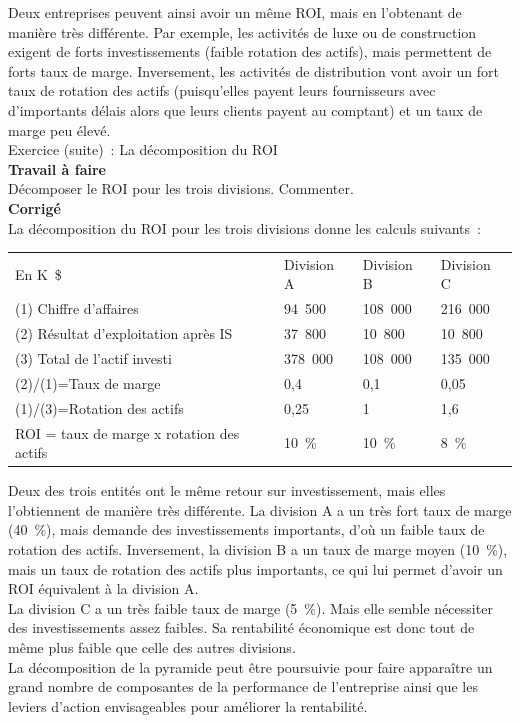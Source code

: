 \documentclass{tufte-handout}
\begin{document}
\begin{enumerate}
Deux entreprises peuvent ainsi avoir un même ROI, mais en l'obtenant de manière très différente. Par exemple, les activités de luxe ou de construction exigent de forts investissements (faible rotation des actifs), mais permettent de forts taux de marge. Inversement, les activités de distribution vont avoir un fort taux de rotation des actifs (puisqu'elles payent leurs fournisseurs avec d'importants délais alors que leurs clients payent au comptant) et un taux de marge peu élevé.\\
Exercice (suite) : La décomposition du ROI\\
\textbf{Travail à faire}\\
Décomposer le ROI pour les trois divisions. Commenter.\\
\textbf{Corrigé}\\
La décomposition du ROI pour les trois divisions donne les calculs suivants :\\
\begin{center}
\begin{tabular}{llll}
En K \$ & Division A & Division B & Division C\\
(1) Chiffre d'affaires & 94 500 & 108 000 & 216 000\\
(2) Résultat d'exploitation après IS & 37 800 & 10 800 & 10 800\\
(3) Total de l'actif investi & 378 000 & 108 000 & 135 000\\
(2)/(1)=Taux de marge & 0,4 & 0,1 & 0,05\\
(1)/(3)=Rotation des actifs & 0,25 & 1 & 1,6\\
ROI = taux de marge x rotation des actifs & 10 \% & 10 \% & 8 \%\\
\end{tabular}
\end{center}
Deux des trois entités ont le même retour sur investissement, mais elles l'obtiennent de manière très différente. La division A a un très fort taux de marge (40 \%), mais demande des investissements importants, d'où un faible taux de rotation des actifs. Inversement, la division B a un taux de marge moyen (10 \%), mais un taux de rotation des actifs plus importants, ce qui lui permet d'avoir un ROI équivalent à la division A.\\
La division C a un très faible taux de marge (5 \%). Mais elle semble nécessiter des investissements assez faibles. Sa rentabilité économique est donc tout de même plus faible que celle des autres divisions.\\
La décomposition de la pyramide peut être poursuivie pour faire apparaître un grand nombre de composantes de la performance de l'entreprise ainsi que les leviers d'action envisageables pour améliorer la rentabilité.\\

\end{enumerate}
\end{document}
